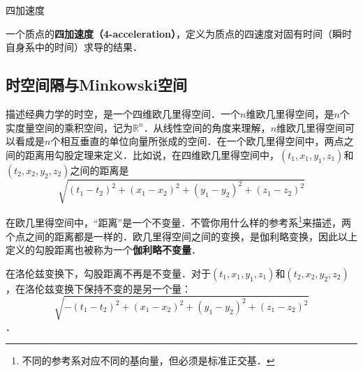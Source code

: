 \begin{definition}{四加速度}

一个质点的\textbf{四加速度（4-acceleration）}，定义为质点的四速度对固有时间（瞬时自身系中的时间）求导的结果．

\end{definition}

\subsection{时空间隔与Minkowski空间}

描述经典力学的时空，是一个四维欧几里得空间．一个$n$维欧几里得空间，是$n$个实度量空间的乘积空间，记为$\mathbb{R}^n$．从线性空间的角度来理解，$n$维欧几里得空间可以看成是$n$个相互垂直的单位向量所张成的空间．在一个欧几里得空间中，两点之间的距离用勾股定理来定义．比如说，在四维欧几里得空间中，$(t_1, x_1, y_1, z_1)$和$(t_2, x_2, y_2, z_2)$之间的距离是$$\sqrt{(t_1-t_2)^2+(x_1-x_2)^2+(y_1-y_2)^2+(z_1-z_2)^2}$$

在欧几里得空间中，“距离”是一个不变量．不管你用什么样的参考系\footnote{不同的参考系对应不同的基向量，但必须是标准正交基．}来描述，两个点之间的距离都是一样的．欧几里得空间之间的变换，是伽利略变换，因此以上定义的勾股距离也被称为一个\textbf{伽利略不变量}．

在洛伦兹变换下，勾股距离不再是不变量．对于$(t_1, x_1, y_1, z_1)$和$(t_2, x_2, y_2, z_2)$，在洛伦兹变换下保持不变的是另一个量：$$\sqrt{-(t_1-t_2)^2+(x_1-x_2)^2+(y_1-y_2)^2+(z_1-z_2)^2}$$．


